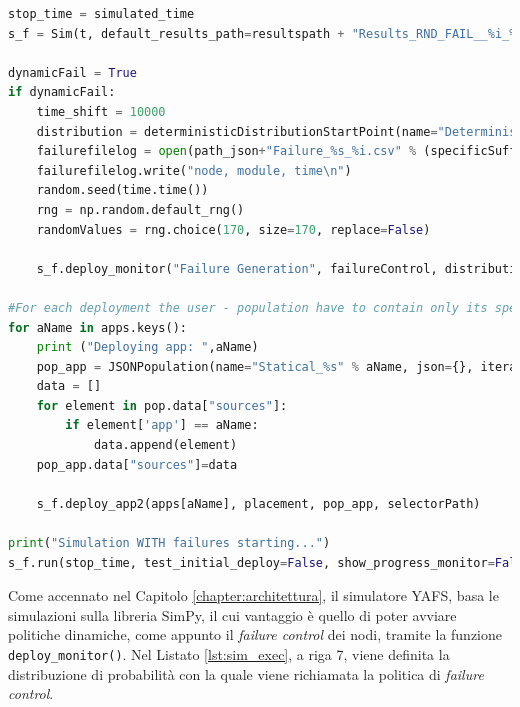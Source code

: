 \begin{lstlisting}[language=python, caption={Creazione della simulazione.}, label={lst:sim_exec}, captionpos=b]
stop_time = simulated_time
s_f = Sim(t, default_results_path=resultspath + "Results_RND_FAIL__%i_%i" % (stop_time,it)) 

dynamicFail = True
if dynamicFail:
    time_shift = 10000
    distribution = deterministicDistributionStartPoint(name="Deterministic", time=time_shift,start=10000)
    failurefilelog = open(path_json+"Failure_%s_%i.csv" % (specificSuffix,stop_time),"w")
    failurefilelog.write("node, module, time\n")
    random.seed(time.time())
    rng = np.random.default_rng()
    randomValues = rng.choice(170, size=170, replace=False)
    
    s_f.deploy_monitor("Failure Generation", failureControl, distribution,sim=s,filelog=failurefilelog,ids=randomValues)

#For each deployment the user - population have to contain only its specific sources
for aName in apps.keys():
    print ("Deploying app: ",aName)
    pop_app = JSONPopulation(name="Statical_%s" % aName, json={}, iteration=it)
    data = []
    for element in pop.data["sources"]:
        if element['app'] == aName:
            data.append(element)
    pop_app.data["sources"]=data

    s_f.deploy_app2(apps[aName], placement, pop_app, selectorPath)

print("Simulation WITH failures starting...")
s_f.run(stop_time, test_initial_deploy=False, show_progress_monitor=False)
\end{lstlisting}

Come accennato nel Capitolo \ref{chapter:architettura}, il simulatore YAFS, basa le simulazioni sulla libreria SimPy, il cui vantaggio è quello di poter avviare politiche dinamiche, come appunto il \textit{failure control} dei nodi, tramite la funzione \texttt{deploy\_monitor()}. Nel Listato \ref{lst:sim_exec}, a riga 7, viene definita la distribuzione di probabilità con la quale viene richiamata la politica di \textit{failure control}.